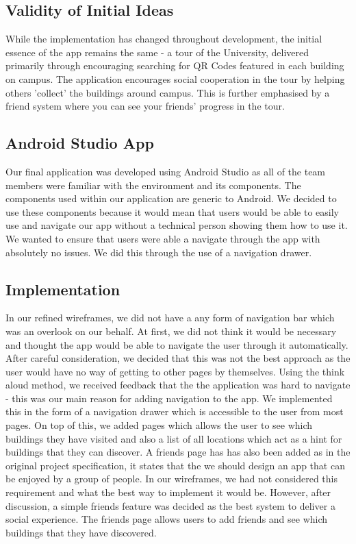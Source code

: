 \documentclass[a4,10pt,twocolumn]{article}
\begin{document}
\subsection{Validity of Initial Ideas}
While the implementation has changed throughout development, the initial essence of the app remains the same - a tour of the University, delivered primarily through encouraging searching for QR Codes featured in each building on campus. The application encourages social cooperation in the tour by helping others 'collect' the buildings around campus. This is further emphasised by a friend system where you can see your friends' progress in the tour. 

\subsection{Android Studio App}
Our final application was developed using Android Studio as all of the team members were familiar with the environment and its components. The components used within our application are generic to Android. We decided to use these components because it would mean that users would be able to easily use and navigate our app without a technical person showing them how to use it. We wanted to ensure that users were able a navigate through the app with absolutely no issues. We did this through the use of a navigation drawer.

\subsection{Implementation}
In our refined wireframes, we did not have a any form of navigation bar which was an overlook on our behalf. At first, we did not think it would be necessary and thought the app would be able to navigate the user through it automatically. After careful consideration, we decided that this was not the best approach as the user would have no way of getting to other pages by themselves. Using the think aloud method, we received feedback that the the application was hard to navigate - this was our main reason for adding navigation to the app. We implemented this in the form of a navigation drawer which is accessible to the user from most pages. On top of this, we added pages which allows the user to see which buildings they have visited and also a list of all locations which act as a hint for buildings that they can discover. A friends page has has also been added as in the original project specification, it states that the we should design an app that can be enjoyed by a group of people. In our wireframes, we had not considered this requirement and what the best way to implement it would be. However, after discussion, a simple friends feature was decided as the best system to deliver a social experience. The friends page allows users to add friends and see which buildings that they have discovered.
\end{document}
